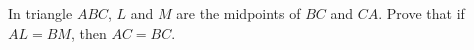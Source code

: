 In triangle $ABC$, $L$ and $M$ are the midpoints of $BC$ and $CA$. Prove that if $AL=BM$, then $AC=BC$.
